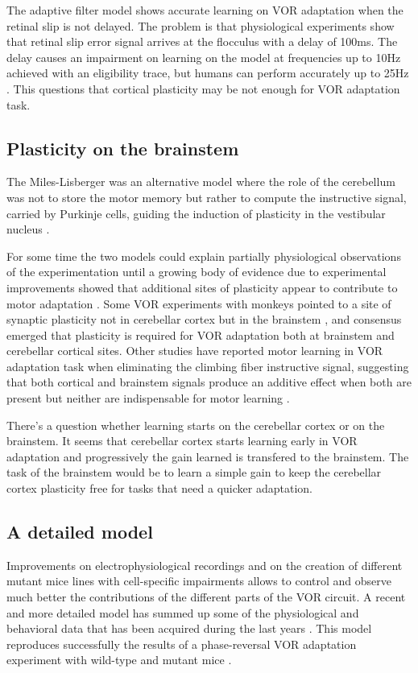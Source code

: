 \documentclass[12pt, a4paper,twoside]{tesi_upf}
\begin{document}
The adaptive filter model shows accurate learning on VOR adaptation when the retinal slip is not delayed. The problem is that physiological experiments show that retinal slip error signal arrives at the flocculus with a delay of 100ms. The delay causes an impairment on learning on the model at frequencies up to 10Hz achieved with an eligibility trace, but humans can perform accurately up to 25Hz \cite{Porrill2007}. This questions that cortical plasticity may be not enough for VOR adaptation task.

\subsection{Plasticity on the brainstem}

The Miles-Lisberger was an alternative model where the role of the cerebellum was not to store the motor memory but rather to compute the instructive signal, carried by Purkinje cells, guiding the induction of plasticity in the vestibular nucleus \cite{Lac1995}.

For some time the two models could explain partially physiological observations of the experimentation until a growing body of evidence due to experimental improvements showed that additional sites of plasticity appear to contribute to motor adaptation \cite{Gao2012}. Some VOR experiments with monkeys pointed to a site of synaptic plasticity not in cerebellar cortex but in the brainstem \cite{Lisberger2009}, and consensus emerged that plasticity is required for VOR adaptation both at brainstem and cerebellar cortical sites. Other studies have reported motor learning in VOR adaptation task when eliminating the climbing fiber instructive signal, suggesting that both cortical and brainstem signals produce an additive effect when both are present but neither are indispensable for motor learning \cite{Ke2009a}.

There's a question whether learning starts on the cerebellar cortex or on the brainstem. It seems that cerebellar cortex starts learning early in VOR adaptation and progressively the gain learned is transfered to the brainstem. The task of the brainstem would be to learn a simple gain to keep the cerebellar cortex plasticity free for tasks that need a quicker adaptation.

\subsection{A detailed model}

Improvements on electrophysiological recordings and on the creation of different mutant mice lines with cell-specific impairments allows to control and observe much better the contributions of the different parts of the VOR circuit. A recent and more detailed model has summed up some of the physiological and behavioral data that has been acquired during the last years \cite{Clopath2014}. This model reproduces successfully the results of a phase-reversal VOR adaptation experiment with wild-type and mutant mice \cite{Wulff2009a}.
\end{document}
